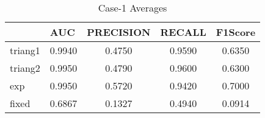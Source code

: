 \begin{table}[htbp]
  \centering
  \caption{Case-1 Averages}
    \begin{tabular}{|p{2.945em}|c|c|c|c|}
    \toprule
    \rowcolor[rgb]{ .718,  .871,  .91} \multicolumn{1}{|l|}{Policy} & \multicolumn{1}{l|}{AUC} & \multicolumn{1}{l|}{PRECISION} & \multicolumn{1}{l|}{RECALL} & \multicolumn{1}{l|}{F1Score} \\
    \midrule
    \rowcolor[rgb]{ .847,  .894,  .737} triang1 & 0.9940 & 0.4750 & 0.9590 & 0.6350 \\
    \midrule
    \rowcolor[rgb]{ .847,  .894,  .737} triang2 & 0.9950 & 0.4790 & 0.9600 & 0.6300 \\
    \midrule
    \rowcolor[rgb]{ .847,  .894,  .737} exp   & 0.9950 & 0.5720 & 0.9420 & 0.7000 \\
    \midrule
    \rowcolor[rgb]{ .847,  .894,  .737} fixed & 0.6867 & 0.1327 & 0.4940 & 0.0914 \\
    \bottomrule
    \end{tabular}%
  \label{tab:sk17mean}%
\end{table}%
